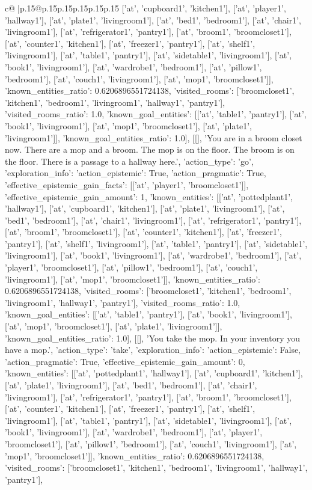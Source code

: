 \documentclass{article}
\begin{document}
{\begin{supertabular}{c@{$\;$}|p{.15\linewidth}@{}p{.15\linewidth}p{.15\linewidth}p{.15\linewidth}p{.15\linewidth}p{.15\linewidth}}
{{{['at', 'cupboard1', 'kitchen1'], ['at', 'player1', 'hallway1'], ['at', 'plate1', 'livingroom1'], ['at', 'bed1', 'bedroom1'], ['at', 'chair1', 'livingroom1'], ['at', 'refrigerator1', 'pantry1'], ['at', 'broom1', 'broomcloset1'], ['at', 'counter1', 'kitchen1'], ['at', 'freezer1', 'pantry1'], ['at', 'shelf1', 'livingroom1'], ['at', 'table1', 'pantry1'], ['at', 'sidetable1', 'livingroom1'], ['at', 'book1', 'livingroom1'], ['at', 'wardrobe1', 'bedroom1'], ['at', 'pillow1', 'bedroom1'], ['at', 'couch1', 'livingroom1'], ['at', 'mop1', 'broomcloset1']], 'known_entities_ratio': 0.6206896551724138, 'visited_rooms': ['broomcloset1', 'kitchen1', 'bedroom1', 'livingroom1', 'hallway1', 'pantry1'], 'visited_rooms_ratio': 1.0, 'known_goal_entities': [['at', 'table1', 'pantry1'], ['at', 'book1', 'livingroom1'], ['at', 'mop1', 'broomcloset1'], ['at', 'plate1', 'livingroom1']], 'known_goal_entities_ratio': 1.0}}], [[], 'You are in a broom closet now. There are a mop and a broom. The mop is on the floor. The broom is on the floor. There is a passage to a hallway here.', {'action_type': 'go', 'exploration_info': {'action_epistemic': True, 'action_pragmatic': True, 'effective_epistemic_gain_facts': [['at', 'player1', 'broomcloset1']], 'effective_epistemic_gain_amount': 1, 'known_entities': [['at', 'pottedplant1', 'hallway1'], ['at', 'cupboard1', 'kitchen1'], ['at', 'plate1', 'livingroom1'], ['at', 'bed1', 'bedroom1'], ['at', 'chair1', 'livingroom1'], ['at', 'refrigerator1', 'pantry1'], ['at', 'broom1', 'broomcloset1'], ['at', 'counter1', 'kitchen1'], ['at', 'freezer1', 'pantry1'], ['at', 'shelf1', 'livingroom1'], ['at', 'table1', 'pantry1'], ['at', 'sidetable1', 'livingroom1'], ['at', 'book1', 'livingroom1'], ['at', 'wardrobe1', 'bedroom1'], ['at', 'player1', 'broomcloset1'], ['at', 'pillow1', 'bedroom1'], ['at', 'couch1', 'livingroom1'], ['at', 'mop1', 'broomcloset1']], 'known_entities_ratio': 0.6206896551724138, 'visited_rooms': ['broomcloset1', 'kitchen1', 'bedroom1', 'livingroom1', 'hallway1', 'pantry1'], 'visited_rooms_ratio': 1.0, 'known_goal_entities': [['at', 'table1', 'pantry1'], ['at', 'book1', 'livingroom1'], ['at', 'mop1', 'broomcloset1'], ['at', 'plate1', 'livingroom1']], 'known_goal_entities_ratio': 1.0}}], [[], 'You take the mop. In your inventory you have a mop.', {'action_type': 'take', 'exploration_info': {'action_epistemic': False, 'action_pragmatic': True, 'effective_epistemic_gain_amount': 0, 'known_entities': [['at', 'pottedplant1', 'hallway1'], ['at', 'cupboard1', 'kitchen1'], ['at', 'plate1', 'livingroom1'], ['at', 'bed1', 'bedroom1'], ['at', 'chair1', 'livingroom1'], ['at', 'refrigerator1', 'pantry1'], ['at', 'broom1', 'broomcloset1'], ['at', 'counter1', 'kitchen1'], ['at', 'freezer1', 'pantry1'], ['at', 'shelf1', 'livingroom1'], ['at', 'table1', 'pantry1'], ['at', 'sidetable1', 'livingroom1'], ['at', 'book1', 'livingroom1'], ['at', 'wardrobe1', 'bedroom1'], ['at', 'player1', 'broomcloset1'], ['at', 'pillow1', 'bedroom1'], ['at', 'couch1', 'livingroom1'], ['at', 'mop1', 'broomcloset1']], 'known_entities_ratio': 0.6206896551724138, 'visited_rooms': ['broomcloset1', 'kitchen1', 'bedroom1', 'livingroom1', 'hallway1', 'pantry1'], }}}
\end{supertabular}}
\end{document}

